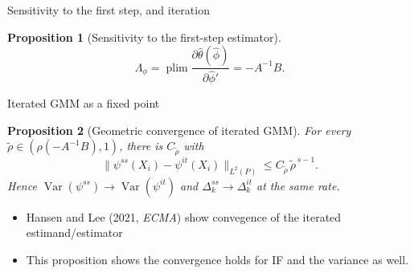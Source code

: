 \documentclass[11pt,aspectratio=169]{beamer}
\newtheorem{prop}{Proposition}
\newcommand{\Var}{\operatorname{Var}}
\newcommand{\assumbtn}{\hfill\hyperlink{jump:assum}{\beamerbutton{Assumption 1}}}
\newcommand{\notebtn}{\hyperlink{jump:notation}{\beamerbutton{Notation}}}
\begin{document}
\begin{frame}{Sensitivity to the first step, and iteration}
    \hypertarget{jump:p3}{}
    \addtocounter{prop}{1}%
    \begin{prop}[Sensitivity to the first-step estimator]
        \[
            \Lambda_\phi=\operatorname*{plim}
            \frac{\partial\widehat\theta(\widehat\phi)}{\partial\widehat\phi'}
            =-A^{-1}B.
        \]
    \end{prop}
\end{frame}

\begin{frame}{Iterated GMM as a fixed point}
    \hypertarget{jump:p4}{}
    \begin{prop}[Geometric convergence of iterated GMM]
        For every $\tilde\rho\in(\rho(-A^{-1}B),1)$, there is $C_{\tilde\rho}$ with
        \[
            \|\psi^{ss}(X_i)-\psi^{it}(X_i)\|_{L^2(P)}\le C_{\tilde\rho}\,\tilde\rho^{\,s-1}.
        \]
        Hence $\Var(\psi^{ss})\to\Var(\psi^{it})$ and
        $\Delta_k^{ss}\to\Delta_k^{it}$ at the same rate.
    \end{prop}
    \begin{itemize}
    	\item Hansen and Lee (2021, \textit{ECMA}) show convegence of the iterated estimand/estimator
    	\item This proposition shows the convergence holds for IF and the variance as well.
    \end{itemize}
\end{frame}
\end{document}
